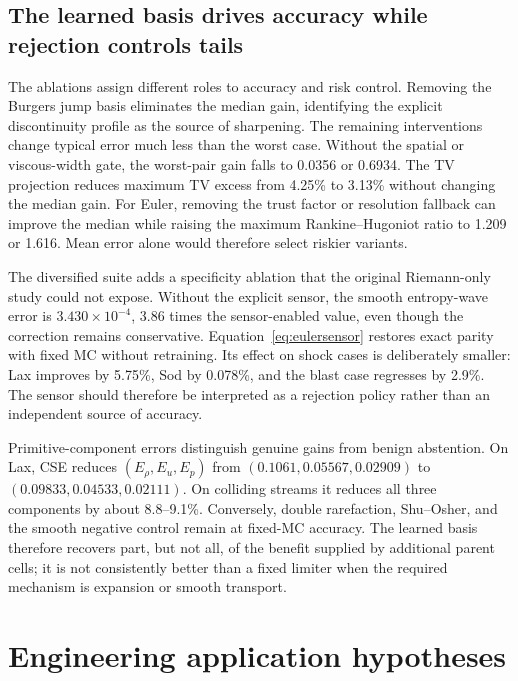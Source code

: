 \documentclass[10pt,twocolumn]{article}
\begin{document}
\noindent\begin{minipage}[t]{0.44\textwidth}
\footnotesize
\subsection{The learned basis drives accuracy while rejection controls tails}

The ablations assign different roles to accuracy and risk control. Removing the Burgers jump basis eliminates the median gain, identifying the explicit discontinuity profile as the source of sharpening. The remaining interventions change typical error much less than the worst case. Without the spatial or viscous-width gate, the worst-pair gain falls to 0.0356 or 0.6934. The TV projection reduces maximum TV excess from 4.25\% to 3.13\% without changing the median gain. For Euler, removing the trust factor or resolution fallback can improve the median while raising the maximum Rankine--Hugoniot ratio to 1.209 or 1.616. Mean error alone would therefore select riskier variants.

The diversified suite adds a specificity ablation that the original Riemann-only study could not expose. Without the explicit sensor, the smooth entropy-wave error is $3.430\times10^{-4}$, 3.86 times the sensor-enabled value, even though the correction remains conservative. Equation~\eqref{eq:eulersensor} restores exact parity with fixed MC without retraining. Its effect on shock cases is deliberately smaller: Lax improves by 5.75\%, Sod by 0.078\%, and the blast case regresses by 2.9\%. The sensor should therefore be interpreted as a rejection policy rather than an independent source of accuracy.

Primitive-component errors distinguish genuine gains from benign abstention. On Lax, CSE reduces $(E_\rho,E_u,E_p)$ from $(0.1061,0.05567,0.02909)$ to $(0.09833,0.04533,0.02111)$. On colliding streams it reduces all three components by about 8.8--9.1\%. Conversely, double rarefaction, Shu--Osher, and the smooth negative control remain at fixed-MC accuracy. The learned basis therefore recovers part, but not all, of the benefit supplied by additional parent cells; it is not consistently better than a fixed limiter when the required mechanism is expansion or smooth transport.

\section{Engineering application hypotheses}


\end{minipage}
\end{document}
